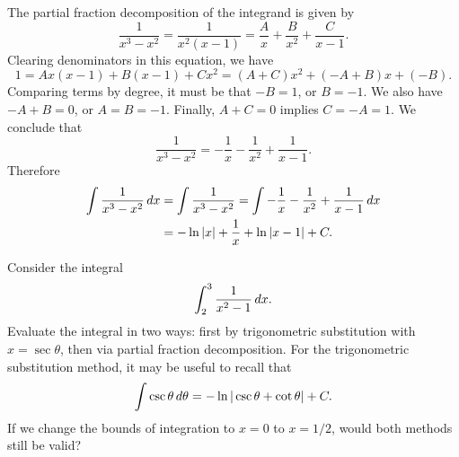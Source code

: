 \documentclass[handout]{ximera}
\begin{document}
\begin{freeResponse}
The partial fraction decomposition of the integrand is given by 
$$
\frac{1}{x^3-x^2} = \frac{1}{x^2(x-1)} = \frac{A}{x} + \frac{B}{x^2} + \frac{C}{x-1}.
$$
Clearing denominators in this equation, we have
$$
1 = Ax(x-1) + B(x-1) + Cx^2 = (A + C)x^2 + (-A + B) x + (-B).
$$
Comparing terms by degree, it must be that $-B = 1$, or $B=-1$. We also have $-A+B = 0$, or $A=B=-1$. Finally, $A+C=0$ implies $C = -A = 1$. We conclude that 
$$
\frac{1}{x^3-x^2} = -\frac{1}{x} - \frac{1}{x^2} + \frac{1}{x-1}.
$$
Therefore
\begin{align*}
\int \frac{1}{x^3-x^2} \mathop{}\!d x &= \int \frac{1}{x^3-x^2} = \int -\frac{1}{x} - \frac{1}{x^2} + \frac{1}{x-1}\mathop{}\!d x  \\
&= -\ln |x| + \frac{1}{x} + \ln |x-1| + C.
\end{align*} 
\end{freeResponse}

\begin{problem}
Consider the integral
$$
\int_2^3 \frac{1}{x^2-1} \mathop{}\!d x.
$$
Evaluate the integral in two ways: first by trigonometric substitution with $x=\sec \theta$, then via partial fraction decomposition. For the trigonometric substitution method, it may be useful to recall that
$$
\int \csc \theta \mathop{}\!d \theta = -\ln | \csc \theta + \cot \theta | + C.
$$
If we change the bounds of integration to $x=0$ to $x=1/2$, would both methods still be valid?
\end{problem}
\end{document}
